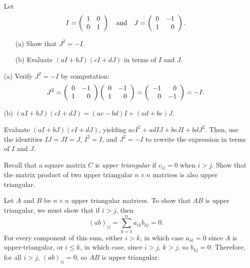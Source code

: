 \documentclass{ximera}
\begin{document}
\begin{exercise} \label{c4.7.5}
Let
\[
I = \left(\begin{array}{rr} 1 & 0\\ 0 &1\end{array}\right) \quad\mbox{and}\quad J =\left(\begin{array}{rr} 0 & -1\\ 1 &0\end{array}\right).
\]
\begin{itemize}
\item[(a)] Show that $J^2=-I$.
\item[(b)] Evaluate $(aI+bJ)(cI+dJ)$ in terms of $I$ and $J$.
\end{itemize}

\begin{solution}

(a) Verify $J^2 = -I$ by computation:
\[ J^2 = \left(\begin{array}{rr} 0 & -1\\ 1 &0\end{array}\right)\left(\begin{array}{rr} 0 & -1\\ 1 &0\end{array}\right) =
\left(\begin{array}{rr} -1 & 0\\ 0 &-1\end{array}\right) = -I. \]

(b) \ans $(aI + bJ)(cI + dJ) = (ac - bd)I + (ad + bc)J$.

\soln Evaluate $(aI + bJ)(cI + dJ)$, yielding
$acI^2 + adIJ + bcJI + bdJ^2$.  Then, use the identities $IJ = JI = J$,
$I^2 = I$, and $J^2 = -I$ to rewrite the expression in terms of $I$
and $J$.

\end{solution}
\end{exercise}

\begin{exercise} \label{c4.7.8}
Recall that a square matrix $C$ is {\em upper triangular\/} if $c_{ij}=0$
when $i>j$.  Show that the matrix product of two upper triangular $n\times n$
matrices is also upper triangular.

\begin{solution}

Let $A$ and $B$ be $n \times n$ upper triangular matrices.  To show
that $AB$ is upper triangular, we must show that if $i > j$, then
\[ (ab)_{ij} = \sum_{k = 1}^{n} a_{ik}b_{kj} = 0. \]
For every component of this sum, either $i > k$, in which case $a_{ik}
= 0$ since $A$ is upper-triangular, or $i \leq k$, in which case, since
$i > j$, $k > j$, so $b_{kj} = 0$.  Therefore, for all $i > j$,
$(ab)_{ij} = 0$, so $AB$ is upper triangular.


\end{solution}
\end{exercise}


\CEXER
\end{document}
